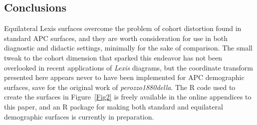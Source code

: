 \documentclass[a4paper]{article}
\begin{document}
\subsection*{Conclusions}
Equilateral Lexis surfaces overcome the problem of cohort distortion found in
standard APC surfaces, and they are worth consideration for use in both
diagnostic and didactic settings, minimally for the sake of comparison. The
small tweak to the cohort dimension that sparked this endeavor has not been
overlooked in recent applications of \textit{Lexis} diagrams, but the coordinate
transform presented here appears never to have been implemented for APC
demographic surfaces, save for the original work of \textit{perozzo1880della}. The R code used to
create the surfaces in Figure~\ref{Fig2} is freely available in the online appendices to this paper, and an R package for making both standard and equilateral demographic surfaces is currently in preparation.


   
\end{document}
